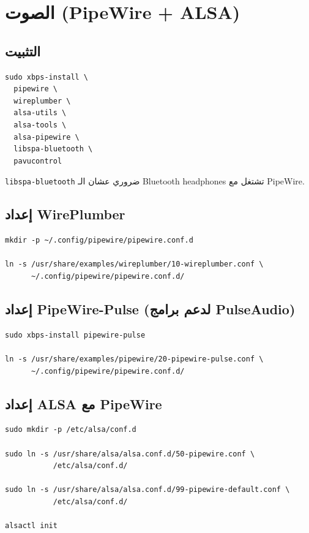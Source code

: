 \documentclass[12pt, a4paper]{report}
\newcommand{\pkg}[1]{\texttt{\color{accent}#1}}
\begin{document}
\chapter{الصوت (PipeWire + ALSA)}

\section{التثبيت}
\begin{lstlisting}
sudo xbps-install \
  pipewire \
  wireplumber \
  alsa-utils \
  alsa-tools \
  alsa-pipewire \
  libspa-bluetooth \
  pavucontrol
\end{lstlisting}

\begin{tcolorbox}[notebox]
\pkg{libspa-bluetooth} ضروري عشان الـ Bluetooth headphones تشتغل مع PipeWire.
\end{tcolorbox}

\section{إعداد WirePlumber}
\begin{lstlisting}
mkdir -p ~/.config/pipewire/pipewire.conf.d

ln -s /usr/share/examples/wireplumber/10-wireplumber.conf \
      ~/.config/pipewire/pipewire.conf.d/
\end{lstlisting}

\section{إعداد PipeWire-Pulse (لدعم برامج PulseAudio)}
\begin{lstlisting}
sudo xbps-install pipewire-pulse

ln -s /usr/share/examples/pipewire/20-pipewire-pulse.conf \
      ~/.config/pipewire/pipewire.conf.d/
\end{lstlisting}

\section{إعداد ALSA مع PipeWire}
\begin{lstlisting}
sudo mkdir -p /etc/alsa/conf.d

sudo ln -s /usr/share/alsa/alsa.conf.d/50-pipewire.conf \
           /etc/alsa/conf.d/

sudo ln -s /usr/share/alsa/alsa.conf.d/99-pipewire-default.conf \
           /etc/alsa/conf.d/

alsactl init
\end{lstlisting}
\end{document}
